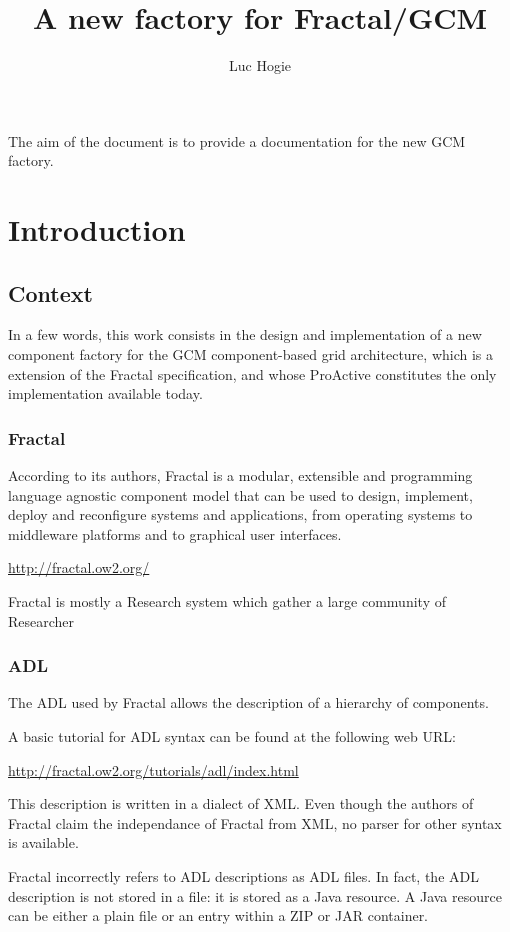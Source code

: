 \documentclass{article}
\title{A new factory for Fractal/GCM}
\author{Luc Hogie}
\newcommand{\urll}[1]{\begin{center}\url{#1}\end{center}}
\begin{document}
\maketitle

{\footnotesize
\tableofcontents
}
\newpage


The aim of the document is to provide a documentation for the new GCM factory.

\section{Introduction}

\subsection{Context}

In a few words, this work consists in the design and implementation of a new component factory for
the GCM component-based grid architecture, which is a extension of the Fractal specification, and whose
ProActive constitutes the only implementation available today.


\subsubsection{Fractal}

According to its authors, Fractal is a modular, extensible and programming language agnostic component model  that can be used to design, implement, deploy and reconfigure systems and applications, from operating systems to middleware platforms and to graphical user interfaces.
\urll{http://fractal.ow2.org/}
Fractal is mostly a Research system which gather a large community of Researcher


\subsubsection{ADL}

The ADL used by Fractal allows the description of a hierarchy of  components.

A basic tutorial for ADL syntax can be found at the following web URL:
\urll{http://fractal.ow2.org/tutorials/adl/index.html}

This description is written in a dialect of XML.
Even though the authors of Fractal claim
the independance of Fractal from XML, no parser for other syntax is available.

Fractal incorrectly refers to ADL descriptions as ADL files. In fact, the ADL description
is not stored in a file: it is stored as a Java resource. A Java resource can be either a plain file
or an entry within a ZIP or JAR container.
\end{document}
